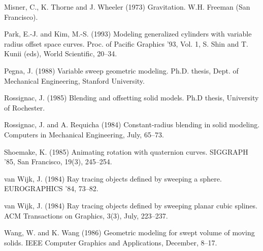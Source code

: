 \begin{thebibliography}{Shoemake 85}
Misner, C., K. Thorne and J. Wheeler (1973)
Gravitation.  W.H. Freeman (San Francisco).

Park, E.-J. and Kim, M.-S. (1993)
Modeling generalized cylinders with variable radius offset space curves.
Proc. of Pacific Graphics '93, Vol. 1, S. Shin and T. Kunii (eds),
World Scientific, 20--34.

Pegna, J. (1988) Variable sweep geometric modeling.
Ph.D. thesis, Dept. of Mechanical Engineering, Stanford University.

Rossignac, J. (1985)
Blending and offsetting solid models.
Ph.D thesis, University of Rochester.

Rossignac, J. and A. Requicha (1984)
Constant-radius blending in solid modeling.
Computers in Mechanical Engineering, July, 65--73.


Shoemake, K. (1985) Animating rotation with quaternion curves.
SIGGRAPH '85, San Francisco, 19(3), 245--254.

van Wijk, J. (1984)
Ray tracing objects defined by sweeping a sphere.
EUROGRAPHICS '84, 73--82.

van Wijk, J. (1984)
Ray tracing objects defined by sweeping planar cubic splines.
ACM Transactions on Graphics, 3(3), July, 223--237.

Wang, W. and K. Wang (1986)
Geometric modeling for swept volume of moving solids.
IEEE Computer Graphics and Applications, December, 8--17.

\end{thebibliography}
\fi





